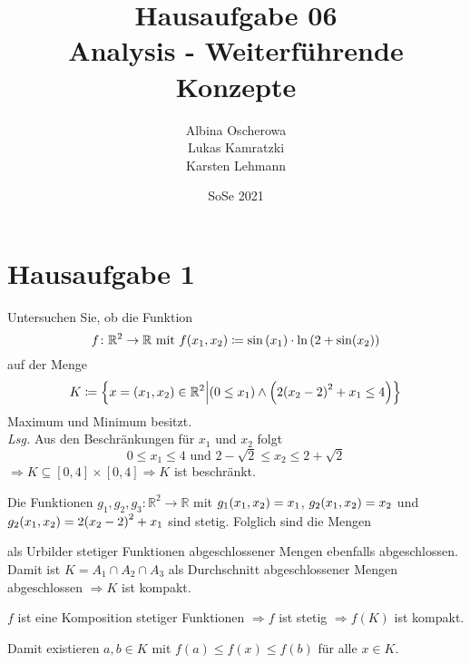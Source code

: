 \documentclass{scrreprt}
\author{Albina Oscherowa \\ Lukas Kamratzki \\ Karsten Lehmann}
\date{SoSe 2021}
\title{Hausaufgabe 06 \\Analysis - Weiterführende Konzepte}
\begin{document}
\section*{Hausaufgabe 1}

Untersuchen Sie, ob die Funktion
\[
  f \colon \mathbb{R}^2 \to \mathbb{R} \text{ mit }
  f\qty(x_1, x_2) \coloneqq \sin\qty(x_1) \cdot \ln\qty(2 + \sin(x_2))
\]
auf der Menge
\[
  K \coloneqq \qty{x = \qty(x_1, x_2) \in \mathbb{R}^2 \middle| \qty(0 \leq x_1) \land \qty(2\qty(x_2 - 2)^2 + x_1 \leq 4)}
\]
Maximum und Minimum besitzt. \\

\textit{Lsg.} Aus den Beschränkungen für $x_1$ und $x_2$ folgt
\[
  0 \leq x_1 \leq 4 \text{ und } 2 - \sqrt{2} \leq x_2 \leq 2 + \sqrt{2}
\]
$\Rightarrow K \subseteq [0, 4] \times [0, 4] \Rightarrow K$ ist beschränkt.

\begin{center}
\end{center}

Die Funktionen $g_1, g_2, g_3 \colon \mathbb{R}^2 \to \mathbb{R}$ mit
$g_1\qty(x_1, x_2) = x_1$, $g_2\qty(x_1, x_2) = x_2$ und
$g_2\qty(x_1, x_2) = 2\qty(x_2 - 2)^2 + x_1$ sind stetig.
Folglich sind die Mengen
\begin{flalign*}
  A_1 &\coloneqq g_1^{-1}([0, \infty)) = [0, \infty) \times {} & \\
  A_2 &\coloneqq g_2^{-1}([0, \infty)) =  ) =
  \qty{\qty(x_1, x_2) \in \mathbb{R}^2 \middle| \qty(x_1 \in \mathbb{R}) \land \qty(x_1 \leq 2\qty(2 - \qty(x_2 - 2)^2))}
\end{flalign*}
als Urbilder stetiger Funktionen abgeschlossener Mengen ebenfalls abgeschlossen.
Damit ist $K = A_1 \cap A_2 \cap A_3$ als Durchschnitt abgeschlossener Mengen
abgeschlossen $\Rightarrow K$ ist kompakt.

$f$ ist eine Komposition stetiger Funktionen
$\Rightarrow f$ ist stetig
$\Rightarrow f(K)$ ist kompakt.

Damit existieren $a, b \in K$ mit $f(a) \leq f(x) \leq f(b)$ für alle
$x \in K$.
\end{document}

